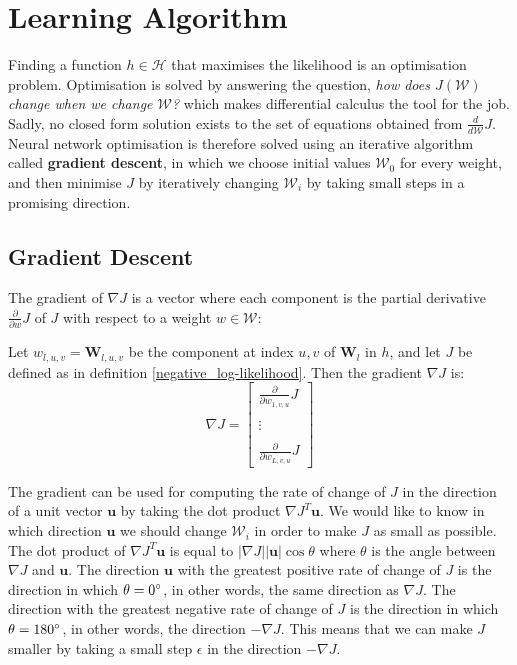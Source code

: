 \section{Learning Algorithm}
\label{learning_algorithm}
Finding a function $h \in \mathcal{H}$ that maximises the likelihood is an optimisation problem. Optimisation is solved by answering the question, \textit{how does $J(\mathcal{W})$ change when we change $\mathcal{W}$?} which makes differential calculus the tool for the job. Sadly, no closed form solution exists to the set of equations obtained from $\frac{d}{d\mathcal{W}}J$. Neural network optimisation is therefore solved using an iterative algorithm called \textbf{gradient descent}, in which we choose initial values $\mathcal{W}_0$ for every weight, and then minimise $J$ by iteratively changing $\mathcal{W}_i$ by taking small steps in a promising direction.

\subsection{Gradient Descent}
\label{gradient_descent}
The gradient of $\nabla J$ is a vector where each component is the partial derivative $\frac{\partial}{\partial w}J$ of $J$ with respect to a weight $w \in \mathcal{W}$:

\begin{definition}[gradient]
	\label{gradient}
	Let $w_{l,u,v} = \mathbf{W}_{l,u,v}$ be the component at index $u,v$ of $\mathbf{W}_l$ in $h$, and let $J$ be defined as in definition \ref{negative_log-likelihood}. Then the gradient $\nabla J$ is:
	$$
	\nabla J = \begin{bmatrix} \frac{\partial}{\partial w_{1,v,u}}J \\ \\ \vdots \\ \\ \frac{\partial}{\partial w_{L,v,u}}J\end{bmatrix}
	$$
\end{definition}
The gradient can be used for computing the rate of change of $J$ in the direction of a unit vector $\mathbf{u}$ by taking the dot product $\nabla J^T\mathbf{u}$. We would like to know in which direction $\mathbf{u}$ we should change $\mathcal{W}_i$ in order to make $J$ as small as possible. The dot product of $\nabla J^T\mathbf{u}$ is equal to $|\nabla J||\mathbf{u}|\cos \theta$ where $\theta$ is the angle between $\nabla J$ and $\mathbf{u}$. The direction $\mathbf{u}$ with the greatest positive rate of change of $J$ is the direction in which $\theta = 0\degree$, in other words, the same direction as $\nabla J$. The direction with the greatest negative rate of change of $J$ is the direction in which $\theta = 180\degree$, in other words, the direction $-\nabla J$. This means that we can make $J$ smaller by taking a small step $\epsilon$ in the direction $-\nabla J$.


